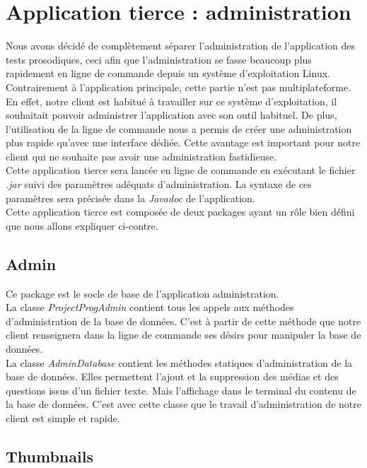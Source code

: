 \section{Application tierce : administration}

Nous avons décidé de complètement séparer l'administration de l'application des tests prosodiques, ceci afin que l'administration se fasse beaucoup plus rapidement en ligne de commande depuis un système d'exploitation Linux. Contrairement à l'application principale, cette partie n'est pas multiplateforme. En effet, notre client est habitué à travailler sur ce système d'exploitation, il souhaitait pouvoir administrer l'application avec son outil habituel. De plus, l'utilisation de la ligne de commande nous a permis de créer une administration plus rapide qu'avec une interface dédiée. Cette avantage est important pour notre client qui ne souhaite pas avoir une administration fastidieuse.\\

Cette application tierce sera lancée en ligne de commande en exécutant le fichier \textit{.jar} suivi des paramètres adéquats d'administration. La syntaxe de ces paramètres sera précisée dans la \textit{Javadoc} de l'application.\\

Cette application tierce est composée de deux packages ayant un rôle bien défini que nous allons expliquer ci-contre.

\subsection{Admin}

Ce package est le socle de base de l'application administration.\\
La classe \textit{ProjectProgAdmin} contient tous les appels aux méthodes d'administration de la base de données. C'est à partir de cette méthode que notre client renseignera dans la ligne de commande ses désirs pour manipuler la base de données.\\
La classe \textit{AdminDatabase} contient les méthodes statiques d'administration de la base de données. Elles permettent l'ajout et la suppression des médias et des questions issus d'un fichier texte. Mais l'affichage dans le terminal du contenu de la base de données. C'est avec cette classe que le travail d'administration de notre client est simple et rapide.

\subsection{Thumbnails}

